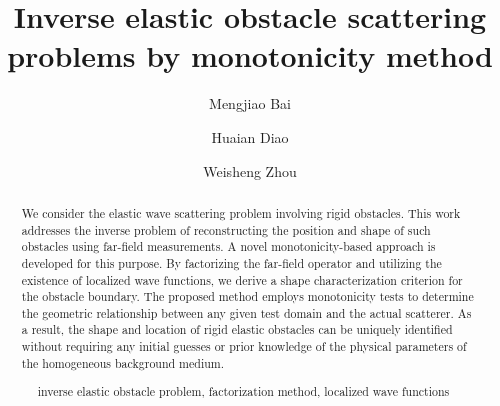 \documentclass[11pt,reqno,twoside]{amsart}
\title[Inverse elastic obstacle scattering problems by monotonicity method]{Inverse elastic obstacle scattering problems by monotonicity method}
\author{Mengjiao Bai}
\author{Huaian Diao}
\author{Weisheng Zhou}
\date{} %
\theoremstyle{definition}
\theoremstyle{remark}
\numberwithin{equation}{section}
\begin{document}
	\maketitle
	
	\begin{abstract}	
	
	We consider the elastic wave scattering problem involving rigid obstacles. This work addresses the inverse problem of reconstructing the position and shape of such obstacles using far-field measurements. A novel monotonicity-based approach is developed for this purpose. By factorizing the far-field operator and utilizing the existence of localized wave functions, we derive a shape characterization criterion for the obstacle boundary. The proposed method employs monotonicity tests to determine the geometric relationship between any given test domain and the actual scatterer. As a result, the shape and location of rigid elastic obstacles can be uniquely identified without requiring any initial guesses or prior knowledge of the physical parameters of the homogeneous background medium.
	

		\medskip
		
		~~ inverse elastic obstacle problem, factorization method, localized wave functions 
		
		\medskip
		
	\end{abstract}
\end{document}
